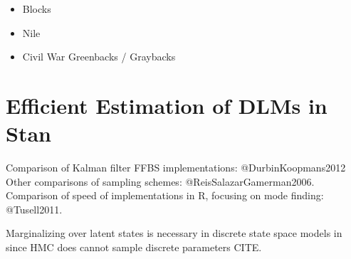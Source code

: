 \begin{itemize}
\item Blocks
\item Nile
\item Civil War Greenbacks / Graybacks
\end{itemize}






\section{Efficient Estimation of DLMs in Stan}
\label{dlm:sec:effic-estim-dlms}

Comparison of Kalman filter FFBS implementations: @DurbinKoopmans2012
Other comparisons of sampling schemes: @ReisSalazarGamerman2006.
Comparison of speed of implementations in R, focusing on mode finding: @Tusell2011.


Marginalizing over latent states is necessary in discrete state space models in \Stan{} since HMC does cannot sample discrete parameters CITE.


